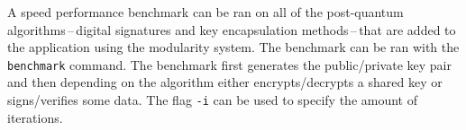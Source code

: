 A speed performance benchmark can be ran on all of the post-quantum algorithms\,--\,digital signatures and key encapsulation methods\,--\,that are added to the application using the modularity system. The benchmark can be ran with the \texttt{benchmark} command. The benchmark first generates the public/private key pair and then depending on the algorithm either encrypts/decrypts a shared key or signs/verifies some data. The flag \texttt{-i} can be used to specify the amount of iterations.